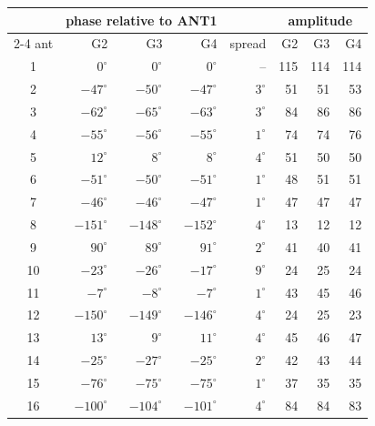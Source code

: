 \documentclass[11pt,a4paper]{article}
\begin{document}
\begin{center}
\begin{tabular}{crrrrrrr}
\toprule
 & \multicolumn{3}{c}{phase relative to ANT1} & & \multicolumn{3}{c}{amplitude} \\
\cmidrule{2-4}\cmidrule{6-8}
ant & G2 & G3 & G4 & spread & G2 & G3 & G4 \\
\midrule
1  & $0^\circ$    & $0^\circ$    & $0^\circ$    & --          & 115 & 114 & 114 \\
2  & $-47^\circ$  & $-50^\circ$  & $-47^\circ$  & $3^\circ$   & 51  & 51  & 53 \\
3  & $-62^\circ$  & $-65^\circ$  & $-63^\circ$  & $3^\circ$   & 84  & 86  & 86 \\
4  & $-55^\circ$  & $-56^\circ$  & $-55^\circ$  & $1^\circ$   & 74  & 74  & 76 \\
5  & $12^\circ$   & $8^\circ$    & $8^\circ$    & $4^\circ$   & 51  & 50  & 50 \\
6  & $-51^\circ$  & $-50^\circ$  & $-51^\circ$  & $1^\circ$   & 48  & 51  & 51 \\
7  & $-46^\circ$  & $-46^\circ$  & $-47^\circ$  & $1^\circ$   & 47  & 47  & 47 \\
8  & $-151^\circ$ & $-148^\circ$ & $-152^\circ$ & $4^\circ$   & 13  & 12  & 12 \\
9  & $90^\circ$   & $89^\circ$   & $91^\circ$   & $2^\circ$   & 41  & 40  & 41 \\
10 & $-23^\circ$  & $-26^\circ$  & $-17^\circ$  & $9^\circ$   & 24  & 25  & 24 \\
11 & $-7^\circ$   & $-8^\circ$   & $-7^\circ$   & $1^\circ$   & 43  & 45  & 46 \\
12 & $-150^\circ$ & $-149^\circ$ & $-146^\circ$ & $4^\circ$   & 24  & 25  & 23 \\
13 & $13^\circ$   & $9^\circ$    & $11^\circ$   & $4^\circ$   & 45  & 46  & 47 \\
14 & $-25^\circ$  & $-27^\circ$  & $-25^\circ$  & $2^\circ$   & 42  & 43  & 44 \\
15 & $-76^\circ$  & $-75^\circ$  & $-75^\circ$  & $1^\circ$   & 37  & 35  & 35 \\
16 & $-100^\circ$ & $-104^\circ$ & $-101^\circ$ & $4^\circ$   & 84  & 84  & 83 \\
\bottomrule
\end{tabular}
\end{center}
\end{document}
